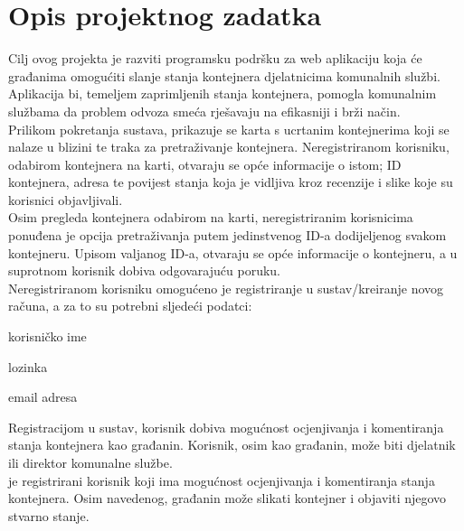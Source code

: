 \chapter{Opis projektnog zadatka}

		Cilj ovog projekta je razviti programsku podršku za web aplikaciju koja će građanima omogućiti slanje stanja kontejnera djelatnicima komunalnih službi. Aplikacija bi, temeljem zaprimljenih stanja kontejnera, pomogla komunalnim službama da problem odvoza smeća rješavaju na efikasniji i brži način.\\
		
		Prilikom pokretanja sustava, prikazuje se karta s ucrtanim kontejnerima koji se nalaze u blizini te traka za pretraživanje kontejnera.
        Neregistriranom korisniku, odabirom kontejnera na karti, otvaraju se opće informacije o istom; ID kontejnera, adresa te povijest stanja
        koja je vidljiva kroz recenzije i slike koje su korisnici objavljivali.\\

        Osim pregleda kontejnera odabirom na karti, neregistriranim korisnicima ponuđena je opcija pretraživanja
        putem jedinstvenog ID-a dodijeljenog svakom kontejneru. Upisom valjanog ID-a, otvaraju se opće informacije o kontejneru, a u suprotnom korisnik dobiva odgovarajuću
        poruku.\\
        
        Neregistriranom korisniku omogućeno je registriranje u sustav/kreiranje novog računa, a
        za to su potrebni sljedeći podatci:
        \begin{packed_item}
			
			\item  korisničko ime
			\item  lozinka
			\item  email adresa
			
		\end{packed_item}
		
		Registracijom u sustav, korisnik dobiva mogućnost ocjenjivanja i komentiranja stanja kontejnera kao građanin. Korisnik, osim kao građanin, može biti djelatnik ili direktor komunalne službe.\\
		
		 je registrirani korisnik koji ima mogućnost ocjenjivanja i komentiranja stanja kontejnera. Osim navedenog, građanin može slikati kontejner i objaviti njegovo stvarno stanje.\\
		
